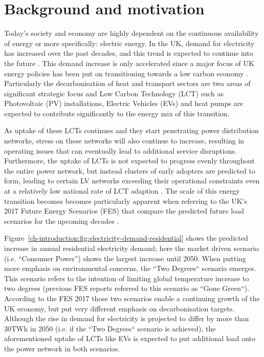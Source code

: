 \section{Background and motivation}
\label{ch-introduction:sec:background}

Today's society and economy are highly dependent on the continuous availability of energy or more specifically: electric energy.
In the UK, demand for electricity has increased over the past decades, and this trend is expected to continue into the future \cite{HMGovernment2009}.
This demand increase is only accelerated since a major focus of UK energy policies has been put on transitioning towards a low carbon economy \cite{RoyalAcademyofEngineering2010}.
Particularly the decarbonisation of heat and transport sectors are two areas of significant strategic focus and Low Carbon Technology (LCT) such as Photovoltaic (PV) installations, Electric Vehicles (EVs) and heat pumps are expected to contribute significantly to the energy mix of this transition.


As uptake of these LCTs continues and they start penetrating power distribution networks, stress on these networks will also continue to increase, resulting in operating issues that can eventually lead to additional service disruptions.
Furthermore, the uptake of LCTs is not expected to progress evenly throughout the entire power network, but instead clusters of early adopters are predicted to form, leading to certain LV networks exceeding their operational constraints even at a relatively low national rate of LCT adaption \cite{Poghosyan2014}.
The scale of this energy transition becomes becomes particularly apparent when referring to the UK's 2017 Future Energy Scenarios (FES) that compare the predicted future load scenarios for the upcoming decades \cite{FES2017}.



Figure~\ref{ch-introduction:fig:electricity-demand-residential} shows the predicted increase in annual residential electricity demand; here the market driven scenario (i.e. ``Consumer Power'') shows the largest increase until 2050.
When putting more emphasis on environmental concerns, the ``Two Degrees`` scenario emerges.
This scenario refers to the intention of limiting global temperature increase to two degrees (previous FES reports referred to this scenario as ``Gone Green``).
According to the FES 2017 those two scenarios enable a continuing growth of the UK economy, but put very different emphasis on decarbonisation targets.
Although the rise in demand for electricity is projected to differ by more than 30TWh in 2050 (i.e. if the ``Two Degrees`` scenario is achieved), the aforementioned uptake of LCTs like EVs is expected to put additional load onto the power network in both scenarios.

